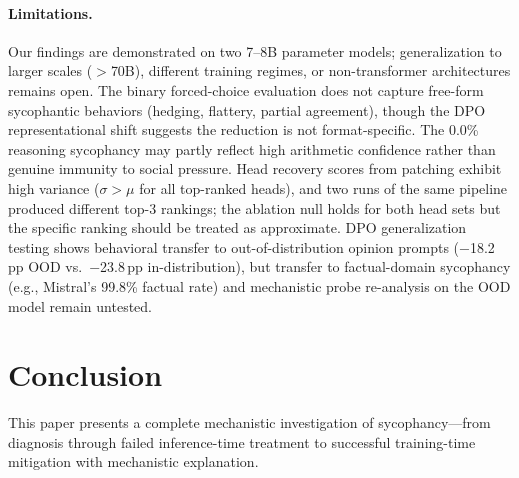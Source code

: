 \documentclass{article}
\begin{document}
\paragraph{Limitations.}
Our findings are demonstrated on two 7--8B parameter models; generalization to larger scales ($>$70B), different training regimes, or non-transformer architectures remains open. The binary forced-choice evaluation does not capture free-form sycophantic behaviors (hedging, flattery, partial agreement), though the DPO representational shift suggests the reduction is not format-specific. The 0.0\% reasoning sycophancy may partly reflect high arithmetic confidence rather than genuine immunity to social pressure. Head recovery scores from patching exhibit high variance ($\sigma > \mu$ for all top-ranked heads), and two runs of the same pipeline produced different top-3 rankings; the ablation null holds for both head sets but the specific ranking should be treated as approximate. DPO generalization testing shows behavioral transfer to out-of-distribution opinion prompts ($-$18.2\,pp OOD vs.\ $-$23.8\,pp in-distribution), but transfer to factual-domain sycophancy (e.g., Mistral's 99.8\% factual rate) and mechanistic probe re-analysis on the OOD model remain untested.

\section{Conclusion}
\label{sec:conclusion}

This paper presents a complete mechanistic investigation of sycophancy---from diagnosis through failed inference-time treatment to successful training-time mitigation with mechanistic explanation.
\end{document}
